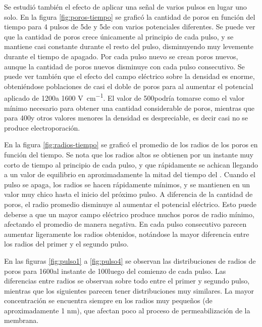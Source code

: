 
Se estudió también el efecto de aplicar una señal de varios pulsos en lugar uno solo. En la figura \ref{fig:poros-tiempo} se graficó la cantidad de poros en función del tiempo para 4 pulsos de 5\ms de \ontime{} y 5\ms de \offtime{} con varios potenciales diferentes. Se puede ver que la cantidad de poros crece únicamente al principio de cada pulso, y se mantiene casi constante durante el resto del pulso, disminuyendo muy levemente durante el tiempo de apagado. Por cada pulso nuevo se crean poros nuevos, aunque la cantidad de poros nuevos disminuye con cada pulso consecutivo. Se puede ver también que el efecto del campo eléctrico sobre la densidad es enorme, obteniéndose poblaciones de casi el doble de poros para al aumentar el potencial aplicado de 1200\vcm a 1600 \si{\volt\per\centi\metre}. El valor de 500\vcm podría tomarse como el valor mínimo necesario para obtener una cantidad considerable de poros, mientras que para 400\vcm y otros valores menores la densidad es despreciable, es decir casi no se produce electroporación. 

En la figura \ref{fig:radios-tiempo} se graficó el promedio de los radios de los poros en función del tiempo. Se nota que los radios altos se obtienen por un instante muy corto de tiempo al principio de cada pulso, y que rápidamente se achican llegando a un valor de equilibrio en aproximadamente la mitad del tiempo del \ontime. Cuando el pulso se apaga, los radios se hacen rápidamente mínimos, y se mantienen en un valor muy chico hasta el inicio del próximo pulso. A diferencia de la cantidad de poros, el radio promedio disminuye al aumentar el potencial eléctrico. Esto puede deberse a que un mayor campo eléctrico produce muchos poros de radio mínimo, afectando el promedio de manera negativa. En cada pulso consecutivo parecen aumentar ligeramente los radios obtenidos, notándose la mayor diferencia entre los radios del primer y el segundo pulso. 

En las figuras \ref{fig:pulso1} a \ref{fig:pulso4} se observan las distribuciones de radios de poros para 1600\vcm al instante de 100\usec luego del comienzo de cada pulso. Las diferencias entre radios se observan sobre todo entre el primer y segundo pulso, mientras que los siguientes parecen tener distribuciones muy similares. La mayor concentración se encuentra siempre en los radios muy pequeños (de aproximadamente 1 \si{\nano\metre}), que afectan poco al proceso de permeabilización de la membrana.

\clearpage

